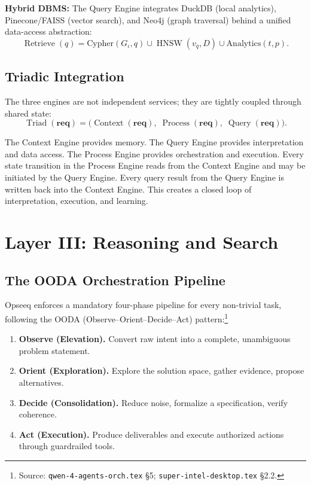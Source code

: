 \documentclass[11pt]{article}
\theoremstyle{remark}
\DeclareMathOperator{\Triad}{Triad}
\DeclareMathOperator{\Context}{Context}
\DeclareMathOperator{\Process}{Process}
\DeclareMathOperator{\Query}{Query}
\DeclareMathOperator{\Retrieve}{Retrieve}
\DeclareMathOperator{\HNSW}{HNSW}
\newcommand{\req}{\mathbf{req}}
\begin{document}
\textbf{Hybrid DBMS:} The Query Engine integrates DuckDB (local analytics), Pinecone/FAISS (vector search), and Neo4j (graph traversal) behind a unified data-access abstraction:
\[
\Retrieve(q) = \mathrm{Cypher}(G_\iota, q) \cup \HNSW(v_q, D) \cup \mathrm{Analytics}(t, p).
\]

\subsection{Triadic Integration}
\label{subsec:triad_integration}

The three engines are not independent services; they are tightly coupled through shared state:
\[
\Triad(\req) = \bigl(\Context(\req),\; \Process(\req),\; \Query(\req)\bigr).
\]

The Context Engine provides memory. The Query Engine provides interpretation and data access. The Process Engine provides orchestration and execution. Every state transition in the Process Engine reads from the Context Engine and may be initiated by the Query Engine. Every query result from the Query Engine is written back into the Context Engine. This creates a closed loop of interpretation, execution, and learning.

\section{Layer III: Reasoning and Search}
\label{sec:reasoning}

\subsection{The OODA Orchestration Pipeline}
\label{subsec:ooda}

Opseeq enforces a mandatory four-phase pipeline for every non-trivial task, following the OODA (Observe--Orient--Decide--Act) pattern:\footnote{Source: \texttt{qwen-4-agents-orch.tex} \S5; \texttt{super-intel-desktop.tex} \S2.2.}

\begin{enumerate}
  \item \textbf{Observe (Elevation).} Convert raw intent into a complete, unambiguous problem statement.
  \item \textbf{Orient (Exploration).} Explore the solution space, gather evidence, propose alternatives.
  \item \textbf{Decide (Consolidation).} Reduce noise, formalize a specification, verify coherence.
  \item \textbf{Act (Execution).} Produce deliverables and execute authorized actions through guardrailed tools.
\end{enumerate}
\end{document}
